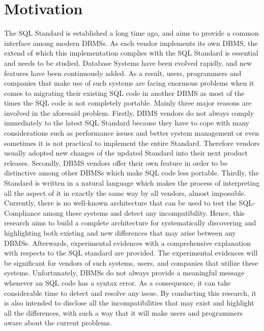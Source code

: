  \section{Motivation}
 The SQL Standard is established a long time ago, and aims to provide a common interface among modern DBMSs. As each vendor implements its own DBMS, the extend of which this implementation complies with the SQL Standard is essential and needs to be studied. Database Systems have been evolved rapidly, and new features have been continuously added. As a result, users, programmers and companies that make use of such systems are facing enormous problems when it comes to migrating their existing SQL code in another DBMS as most of the times the SQL code is not completely portable. Mainly three major reasons are involved in the aforesaid problem.  Firstly, DBMS vendors do not always comply immediately to the latest SQL Standard because they have to cope with many considerations such as performance issues and better system management or even sometimes it is not practical to implement the entire Standard. Therefore vendors usually adopted new changes of the updated Standard into their next product releases. Secondly, DBMS vendors offer their own feature in order to be distinctive among other DBMSs which make SQL code less portable. Thirdly, the Standard is written in a natural language which makes the process of interpreting all the aspect of it in exactly the same way by all vendors, almost impossible.  Currently, there is no well-known architecture that can be used to test the SQL-Compliance among these systems and detect any incompatibility. Hence, this research aims to build a complete architecture for systematically discovering and highlighting both existing and new differences that may arise between any DBMSs. Afterwards, experimental evidences with a comprehensive explanation with respects to the SQL standard are provided. The experimental evidences will be significant for vendors of such systems, users, and companies that utilize these systems. Unfortunately, DBMSs do not always provide a meaningful message whenever an SQL code has a syntax error. As a consequence, it can take considerable time to detect and resolve any issue. By conducting this research, it is also intended to disclose all the incompatibilities that may exist and highlight all the differences, with such a way that it will make users and programmers aware about the current problems.
 
